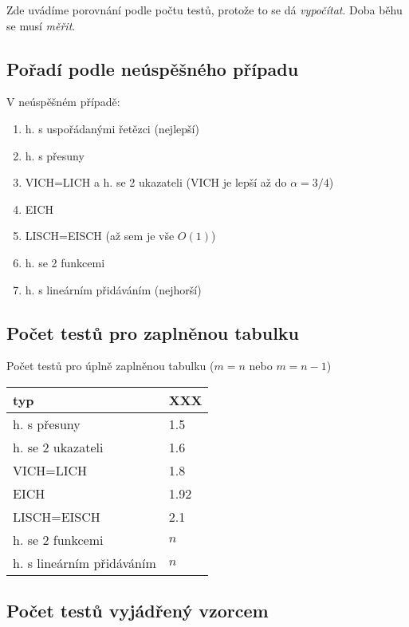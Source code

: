 Zde uvádíme porovnání podle počtu testů, protože to se dá
{\em vypočítat}. Doba běhu se musí {\em měřit}.

\subsection{Pořadí podle neúspěšného případu}

\begin{samepage}
V neúspěšném případě:
\begin{enumerate}
\item h. s uspořádanými řetězci (nejlepší)
\item h. s přesuny
\item VICH=LICH a h. se 2 ukazateli (VICH je lepší až do $\alpha=3/4$)
\item EICH
\item LISCH=EISCH (až sem je vše $O(1)$)
\item h. se 2 funkcemi
\item h. s lineárním přidáváním (nejhorší)
\end{enumerate}
\end{samepage}


\subsection{Počet testů pro zaplněnou tabulku}

Počet testů pro úplně zaplněnou tabulku ($m=n$ nebo $m=n-1$)

\vspace{5mm}

\begin{tabular}{|l|l|}
\hline
typ	& XXX \\
\hline
h. s přesuny&		1.5\\
h. se 2 ukazateli&	1.6\\
VICH=LICH&		1.8\\
EICH&			1.92\\
LISCH=EISCH&		2.1\\
\hline
h. se 2 funkcemi&	$n$\\
h. s lineárním přidáváním&$n$\\
\hline
\end{tabular}


\subsection{Počet testů vyjádřený vzorcem}

